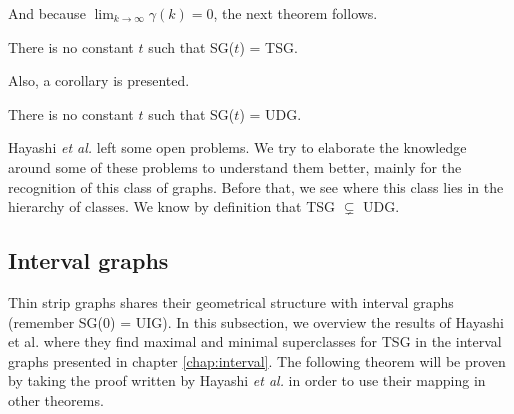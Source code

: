 And because $\lim_{k \to \infty}\gamma(k) = 0$, the next theorem follows.

\begin{theorem}
  There is no constant $t$ such that SG($t$) = TSG.
\end{theorem}

Also, a corollary is presented.

\begin{theorem}
  There is no constant $t$ such that SG($t$) = UDG.
\end{theorem}


Hayashi \textit{et al.} left some open problems. We try to elaborate the knowledge around some of these problems
to understand them better, mainly for the recognition of this class of graphs. Before that, we see where this class lies in the hierarchy of classes. We know by definition that TSG $\subsetneq$ UDG.

\subsection{Interval graphs}

Thin strip graphs shares their geometrical structure with interval graphs (remember SG($0$) = UIG). In this subsection, we overview the results of Hayashi et al. \cite{hayashiThinStripGraphs2017} where they find maximal and minimal superclasses for TSG in the interval graphs presented in chapter \ref{chap:interval}. The following theorem will be proven by taking the proof written by Hayashi \textit{et al.} in order to use their mapping in other theorems.


